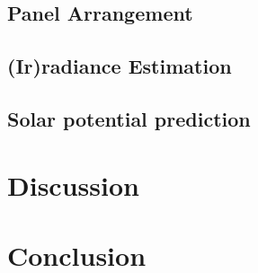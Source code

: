 \documentclass{article} %
\begin{document}
\subsection*{Panel Arrangement}
\subsection*{(Ir)radiance Estimation}
\subsection*{Solar potential prediction}




\section*{Discussion}


\section*{Conclusion}


\newpage



\end{document}
